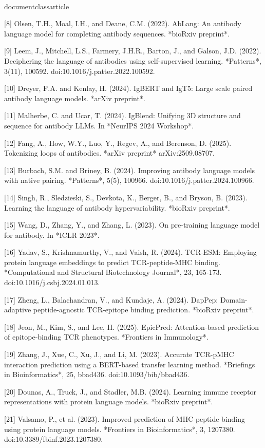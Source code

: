 \\documentclass{article}
\begin{document}
[8] Olsen, T.H., Moal, I.H., and Deane, C.M. (2022). AbLang: An antibody language model for completing antibody sequences. *bioRxiv preprint*.

[9] Leem, J., Mitchell, L.S., Farmery, J.H.R., Barton, J., and Galson, J.D. (2022). Deciphering the language of antibodies using self-supervised learning. *Patterns*, 3(11), 100592. doi:10.1016/j.patter.2022.100592.

[10] Dreyer, F.A. and Kenlay, H. (2024). IgBERT and IgT5: Large scale paired antibody language models. *arXiv preprint*.

[11] Malherbe, C. and Ucar, T. (2024). IgBlend: Unifying 3D structure and sequence for antibody LLMs. In *NeurIPS 2024 Workshop*.

[12] Fang, A., How, W.Y., Luo, Y., Regev, A., and Berenson, D. (2025). Tokenizing loops of antibodies. *arXiv preprint* arXiv:2509.08707.

[13] Burbach, S.M. and Briney, B. (2024). Improving antibody language models with native pairing. *Patterns*, 5(5), 100966. doi:10.1016/j.patter.2024.100966.

[14] Singh, R., Sledzieski, S., Devkota, K., Berger, B., and Bryson, B. (2023). Learning the language of antibody hypervariability. *bioRxiv preprint*.

[15] Wang, D., Zhang, Y., and Zhang, L. (2023). On pre-training language model for antibody. In *ICLR 2023*.

[16] Yadav, S., Krishnamurthy, V., and Vaish, R. (2024). TCR-ESM: Employing protein language embeddings to predict TCR-peptide-MHC binding. *Computational and Structural Biotechnology Journal*, 23, 165-173. doi:10.1016/j.csbj.2024.01.013.

[17] Zheng, L., Balachandran, V., and Kundaje, A. (2024). DapPep: Domain-adaptive peptide-agnostic TCR-epitope binding prediction. *bioRxiv preprint*.

[18] Jeon, M., Kim, S., and Lee, H. (2025). EpicPred: Attention-based prediction of epitope-binding TCR phenotypes. *Frontiers in Immunology*.

[19] Zhang, J., Xue, C., Xu, J., and Li, M. (2023). Accurate TCR-pMHC interaction prediction using a BERT-based transfer learning method. *Briefings in Bioinformatics*, 25, bbad436. doi:10.1093/bib/bbad436.

[20] Dounas, A., Truck, J., and Stadler, M.B. (2024). Learning immune receptor representations with protein language models. *bioRxiv preprint*.

[21] Valsamo, P., et al. (2023). Improved prediction of MHC-peptide binding using protein language models. *Frontiers in Bioinformatics*, 3, 1207380. doi:10.3389/fbinf.2023.1207380.
\end{document}
